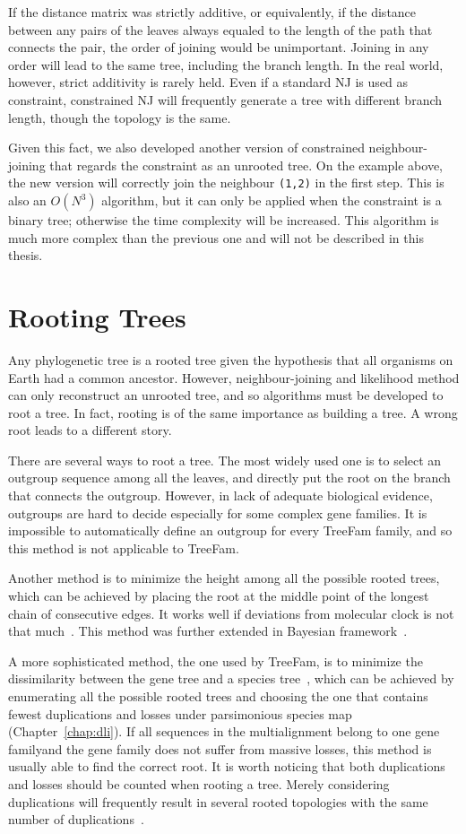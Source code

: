 If the distance matrix was strictly additive, or equivalently, if the distance between any pairs of
the leaves always equaled to the length of the path that connects the pair,
the order of joining would be unimportant. Joining in any order will lead to the same tree, including the branch length.
In the real world, however, strict additivity is rarely held. Even if a standard NJ
is used as constraint, constrained NJ will frequently generate a tree with different
branch length, though the topology is the same.

Given this fact, we also developed another version of constrained neighbour-joining that
regards the constraint as an unrooted tree. On the example above, the new version
will correctly join the neighbour {\tt (1,2)} in the first step. This is also an $O(N^3)$ algorithm, but it
can only be applied when the constraint is a binary tree; otherwise the time complexity will
be increased. This algorithm is much more complex than the previous one and will not be described in this thesis.

\section{Rooting Trees} \label{sec:root-tree}
Any phylogenetic tree is a rooted tree given the hypothesis that all organisms on Earth
had a common ancestor. However, neighbour-joining and likelihood method can only reconstruct
an unrooted tree, and so algorithms must be developed to root a tree. In fact, rooting is of the same
importance as building a tree. A wrong root leads to a different story.

There are several ways to root a tree. The most widely used one is to select an outgroup sequence
among all the leaves, and directly put the root on the branch that connects the outgroup. However,
in lack of adequate biological evidence, outgroups are hard to decide especially for some complex gene families.
It is impossible to automatically define an outgroup for every TreeFam family, and so
this method is not applicable to TreeFam.

Another method is to minimize the height among all the possible rooted trees, which can be achieved by
placing the root at the middle point of the longest chain of consecutive edges.
It works well if deviations from molecular clock is not that much~\cite{durbin98}.
This method was further extended in Bayesian framework~\cite{huelsenbeck02}.

A more sophisticated method, the one used by TreeFam, is to minimize the
dissimilarity between the gene tree and a species tree~\cite{zmasek01},
which can be achieved by enumerating all the possible rooted trees and choosing
the one that contains fewest duplications and losses under parsimonious species map (Chapter~\ref{chap:dli}).
If all sequences in the multialignment belong to one gene familyand the gene family does not suffer from massive losses,
this method is usually able to find the correct root. It is worth noticing that both
duplications and losses should be counted when rooting a tree. Merely considering duplications will
frequently result in several rooted topologies with the same number of duplications~\cite{page97}.

